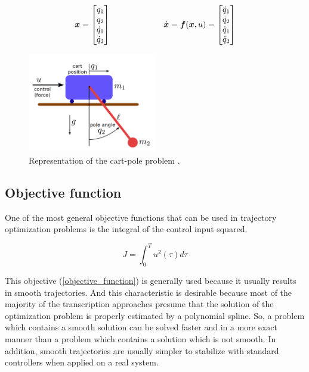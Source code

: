 \documentclass{thesisreport}
\begin{document}
\begin{equation}
\bm{x} = \begin{bmatrix}
q_1\\
q_2\\
\dot{q}_1\\
\dot{q}_2\\
\end{bmatrix}
\text{ \hspace{2 cm} } \dot{\bm{x}} = \bm{f}(\bm{x},u)= \begin{bmatrix}
\dot{q}_1 \\
\dot{q}_2 \\
\ddot{q}_1 \\
\ddot{q}_2 \\
\end{bmatrix}
\end{equation}

\begin{figure}[h]
\centering
\includegraphics[width=0.5\textwidth]{Images/Trajectory/cart_pole}
\caption{Representation of the cart-pole problem \cite{Kelly2017}.}
\label{cart_pole}
\end{figure}

\newpage

\subsection{Objective function}

One of the most general objective functions that can be used in trajectory optimization problems is the integral of the control input squared.

\begin{equation}\label{objective_function}
J = \int_0^T u^2 (\tau) d \tau
\end{equation}

This objective (\ref{objective_function}) is generally used because it usually results in smooth trajectories. And this characteristic is desirable because most of the majority of the transcription approaches presume that the solution of the optimization problem is properly estimated by a polynomial spline. So, a problem which contains a smooth solution can be solved faster and in a more exact manner than a problem which contains a solution which is not smooth. In addition, smooth trajectories are usually simpler to stabilize with standard controllers when applied on a real system.
\end{document}
